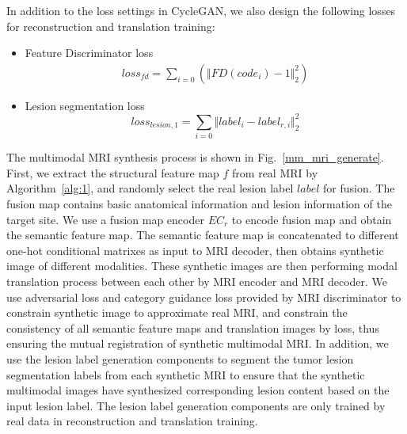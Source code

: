 \documentclass{ecai}
\begin{document}
In addition to the loss settings in CycleGAN, we also design the following losses for reconstruction and translation training:
\begin{itemize}
	\item{Feature Discriminator loss}
	\begin{equation}
	\begin{split}
	loss_{fd}=\sum\limits_{i=0}(\Vert{FD(code_{i})-1}\Vert_{2}^{2})
	\end{split}
	\end{equation}
	\item{Lesion segmentation loss}
	\begin{equation}
	loss_{lesion,1}=\sum\limits_{i=0}\Vert{label_i-label_{r,i}}\Vert_{2}^{2}
	\end{equation}
\end{itemize}

The multimodal MRI synthesis process is shown in Fig.~\ref{mm_mri_generate}. First, we extract the structural feature map $f$ from real MRI by Algorithm~\ref{alg:1}, and randomly select the real lesion label $label$ for fusion. The fusion map contains basic anatomical information and lesion information of the target site. 
We use a fusion map encoder $EC_r$ to encode fusion map and obtain the semantic feature map. The semantic feature map is concatenated to different one-hot conditional matrixes as input to MRI decoder, then obtains synthetic image of different modalities. These synthetic images are then performing modal translation process between each other by MRI encoder and MRI decoder. We use adversarial loss and category guidance loss provided by MRI discriminator to constrain synthetic image to approximate real MRI, and constrain the consistency of all semantic feature maps and translation images by loss, thus ensuring the mutual registration of synthetic multimodal MRI. In addition, we use the lesion label generation components to segment the tumor lesion segmentation labels from each synthetic MRI to ensure that the synthetic multimodal images have synthesized corresponding lesion content based on the input lesion label. The lesion label generation components are only trained by real data in reconstruction and translation training. 
\end{document}

